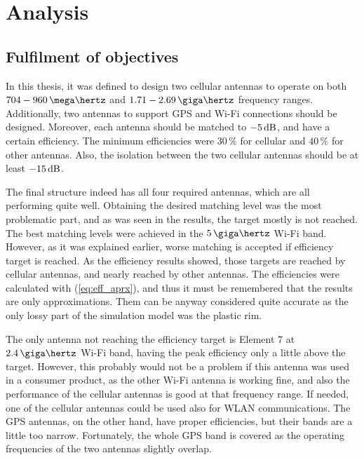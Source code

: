 \section{Analysis}
\label{sec:analysis}


\subsection{Fulfilment of objectives}
\label{sec:fulfilment}
In this thesis, it was defined to design two cellular antennas to operate on both $704-960\,\mega\hertz$ and $1.71-2.69\,\giga\hertz$ frequency ranges. Additionally, two antennas to support GPS and Wi-Fi connections should be designed. Moreover, each antenna should be matched to $-5\,\mathrm{dB}$, and have a certain efficiency. The minimum efficiencies were $30\,\%$ for cellular and $40\,\%$ for other antennas. Also, the isolation between the two cellular antennas should be at least $-15\,\mathrm{dB}$.

The final structure indeed has all four required antennas, which are all performing quite well. Obtaining the desired matching level was the most problematic part, and as was seen in the results, the target mostly is not reached. The best matching levels were achieved in the $5\,\giga\hertz$ Wi-Fi band. However, as it was explained earlier, worse matching is accepted if efficiency target is reached. As the efficiency results showed, those targets are reached by cellular antennas, and nearly reached by other antennas. The efficiencies were calculated with (\ref{eq:eff_aprx}), and thus it must be remembered that the results are only approximations. Them can be anyway considered quite accurate as the only lossy part of the simulation model was the plastic rim. 

The only antenna not reaching the efficiency target is Element 7 at $2.4\,\giga\hertz$ Wi-Fi band, having the peak efficiency only a little above the target. However, this probably would not be a problem if this antenna was used in a consumer product, as the other Wi-Fi antenna is working fine, and also the performance of the cellular antennas is good at that frequency range. If needed, one of the cellular antennas could be used also for WLAN communications. The GPS antennas, on the other hand, have proper efficiencies, but their bands are a little too narrow. Fortunately, the whole GPS band is covered as the operating frequencies of the two antennas slightly overlap.

